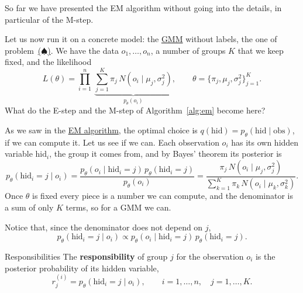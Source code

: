 \documentclass[a4paper,12pt,oneside]{report}
\newcommand{\esteptag}{\casetagbox[TagBlue]{E-step}}
\newcommand{\spadeproblem}{\hyperref[box:spade]{($\spadesuit$)}}
\begin{document}
So far we have presented the EM algorithm without going into the details,
in particular of the M-step.

Let us now run it on a concrete model: the
\hyperref[def:gmm]{GMM} without labels, the one of problem~\spadeproblem.
We have the data $o_1,\ldots,o_n$, a number of groups $K$ that we keep fixed,
and the likelihood
\[
L(\theta)=\prod_{i=1}^n\ \underbrace{\sum_{j=1}^K\pi_j\,
N(o_i\mid\mu_j,\sigma_j^2)}_{p_\theta(o_i)},
\qquad\theta=\{\pi_j,\mu_j,\sigma_j^2\}_{j=1}^K.
\]
What do the E-step and the M-step of Algorithm~\ref{alg:em} become here?

\esteptag\par\smallskip
As we saw in the \hyperref[sec:em]{EM algorithm}, the optimal choice is
$q(\text{hid})=p_\theta(\text{hid}\mid\text{obs})$, if we can compute it.
Let us see if we can. Each observation $o_i$ has its own hidden variable
$\text{hid}_i$, the group it comes from, and by Bayes' theorem its posterior
is
\[
p_\theta(\text{hid}_i=j\mid o_i)
=\frac{p_\theta(o_i\mid\text{hid}_i=j)\,p_\theta(\text{hid}_i=j)}{p_\theta(o_i)}
=\frac{\pi_j\,N(o_i\mid\mu_j,\sigma_j^2)}
{\sum_{k=1}^K\pi_k\,N(o_i\mid\mu_k,\sigma_k^2)}.
\]
Once $\theta$ is fixed every piece is
a number we can compute, and the denominator is a sum of only $K$ terms, so
for a GMM we can.

Notice that, since the denominator does not depend on $j$,
\[
p_\theta(\text{hid}_i=j\mid o_i)\propto p_\theta(o_i\mid\text{hid}_i=j)\,
p_\theta(\text{hid}_i=j).
\]

\begin{frameddefn}{Responsibilities}\label{def:responsibility}
The \textbf{responsibility} of group $j$ for the observation $o_i$ is the
posterior probability of its hidden variable,
\[
r_j^{(i)}=p_\theta(\text{hid}_i=j\mid o_i),
\qquad i=1,\ldots,n,\quad j=1,\ldots,K.
\]
\end{frameddefn}
\end{document}
